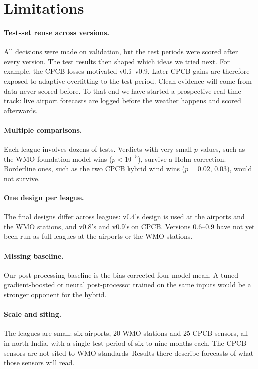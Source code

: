 \section{Limitations}\label{sec:limits}

\paragraph{Test-set reuse across versions.}
All decisions were made on validation, but the test periods were scored after every version. The test results then
shaped which ideas we tried next. For example, the CPCB losses motivated v0.6--v0.9. Later CPCB gains are therefore
exposed to adaptive overfitting to the test period. Clean evidence will come from data never scored before. To that
end we have started a prospective real-time track: live airport forecasts are logged before the weather happens and
scored afterwards.

\paragraph{Multiple comparisons.}
Each league involves dozens of tests. Verdicts with very small $p$-values, such as the WMO foundation-model wins
($p<10^{-5}$), survive a Holm correction. Borderline ones, such as the two CPCB hybrid wind wins ($p=0.02$, $0.03$), would not survive.

\paragraph{One design per league.}
The final designs differ across leagues: v0.4's design is used at the airports and the WMO stations, and v0.8's
and v0.9's on CPCB. Versions 0.6--0.9 have not yet been run as full leagues at the airports or the WMO stations.

\paragraph{Missing baseline.}
Our post-processing baseline is the bias-corrected four-model mean. A tuned gradient-boosted or neural
post-processor \citep{rasp2018postprocessing} trained on the same inputs would be a stronger opponent for the
hybrid.

\paragraph{Scale and siting.}
The leagues are small: six airports, 20 WMO stations and 25 CPCB sensors, all in north India, with a single test period
of six to nine months each. The CPCB sensors are not sited to WMO standards. Results there describe forecasts of what those sensors will
read.

